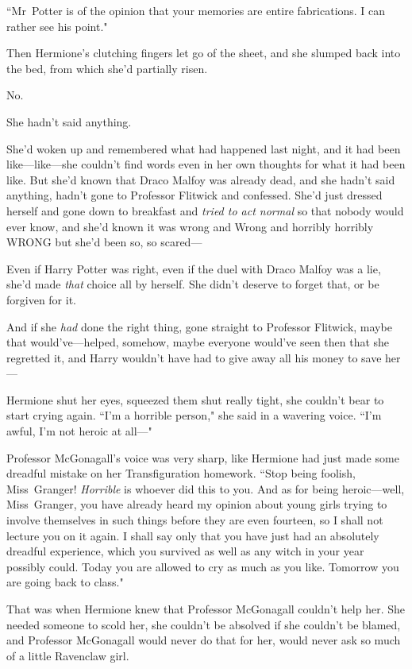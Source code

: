 ``Mr~Potter is of the opinion that your memories are entire fabrications. I can rather see his point."

Then Hermione's clutching fingers let go of the sheet, and she slumped back into the bed, from which she'd partially risen.

No.

She hadn't said anything.

She'd woken up and remembered what had happened last night, and it had been like—like—she couldn't find words even in her own thoughts for what it had been like. But she'd known that Draco Malfoy was already dead, and she hadn't said anything, hadn't gone to Professor Flitwick and confessed. She'd just dressed herself and gone down to breakfast and \emph{tried to act normal} so that nobody would ever know, and she'd known it was wrong and Wrong and horribly horribly WRONG but she'd been so, so scared—

Even if Harry Potter was right, even if the duel with Draco Malfoy was a lie, she'd made \emph{that} choice all by herself. She didn't deserve to forget that, or be forgiven for it.

And if she \emph{had} done the right thing, gone straight to Professor Flitwick, maybe that would've—helped, somehow, maybe everyone would've seen then that she regretted it, and Harry wouldn't have had to give away all his money to save her—

Hermione shut her eyes, squeezed them shut really tight, she couldn't bear to start crying again. ``I'm a horrible person," she said in a wavering voice. ``I'm awful, I'm not heroic at all—"

Professor McGonagall's voice was very sharp, like Hermione had just made some dreadful mistake on her Transfiguration homework. ``Stop being foolish, Miss~Granger! \emph{Horrible} is whoever did this to you. And as for being heroic—well, Miss~Granger, you have already heard my opinion about young girls trying to involve themselves in such things before they are even fourteen, so I shall not lecture you on it again. I shall say only that you have just had an absolutely dreadful experience, which you survived as well as any witch in your year possibly could. Today you are allowed to cry as much as you like. Tomorrow you are going back to class."

That was when Hermione knew that Professor McGonagall couldn't help her. She needed someone to scold her, she couldn't be absolved if she couldn't be blamed, and Professor McGonagall would never do that for her, would never ask so much of a little Ravenclaw girl.

